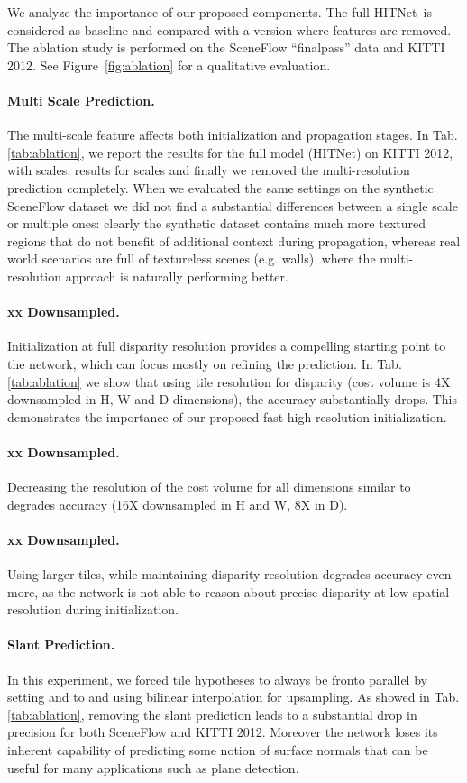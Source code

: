 \documentclass[final]{cvpr}
\newcommand{\algoname}{HITNet}
\begin{document}
We analyze the importance of our proposed components. The full \algoname \ is considered as baseline and compared with a version where features are removed. The ablation study is performed on the SceneFlow ``finalpass'' data and KITTI 2012. See Figure~\ref{fig:ablation} for a qualitative evaluation.


\paragraph{Multi Scale Prediction.} The multi-scale feature affects both initialization and propagation stages. In Tab. \ref{tab:ablation}, we report the results for the full model (\algoname) on KITTI 2012, with  scales, results for  scales and finally we removed the multi-resolution prediction completely. When we evaluated the same settings on the synthetic SceneFlow dataset we did not find a substantial differences between a single scale or multiple ones: clearly the synthetic dataset contains much more textured regions that do not benefit of additional context during propagation, whereas real world scenarios are full of textureless scenes (e.g. walls), where the multi-resolution approach is naturally performing better. 
\paragraph{xx Downsampled.} Initialization at full disparity resolution provides a compelling starting point to the network, which can focus mostly on refining the prediction. In Tab. \ref{tab:ablation} we show that using tile resolution for disparity (cost volume is 4X downsampled in H, W and D dimensions), the accuracy substantially drops. This demonstrates the importance of our proposed fast high resolution initialization.
\paragraph{xx Downsampled.} Decreasing the resolution of the cost volume for all dimensions similar to \cite{pwcnet} degrades accuracy (16X downsampled in H and W, 8X in D).
\paragraph{xx Downsampled.} Using larger tiles, while maintaining disparity resolution degrades accuracy even more, as the network is not able to reason about precise disparity at low spatial resolution during initialization.
\paragraph{Slant Prediction.} In this experiment, we forced tile hypotheses to always be fronto parallel by setting  and  to  and using bilinear interpolation for upsampling. As showed in Tab. \ref{tab:ablation}, removing the slant prediction leads to a substantial drop in precision for both SceneFlow and KITTI 2012. Moreover the network loses its inherent capability of predicting some notion of surface normals that can be useful for many applications such as plane detection.
\end{document}

